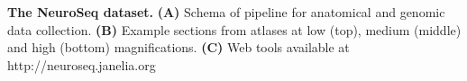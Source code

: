 \textbf{The NeuroSeq dataset.}
\textbf{(A)} Schema of pipeline for anatomical and genomic data collection.
\textbf{(B)} Example sections from atlases at low (top), medium (middle) and high (bottom) magnifications.
\textbf{(C)} Web tools available at http://neuroseq.janelia.org
